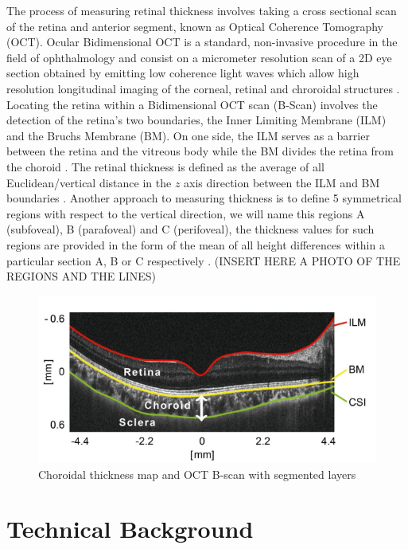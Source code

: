 \documentclass[12pt,a4paper]{scrartcl}
\begin{document}
The process of measuring retinal thickness involves taking a cross sectional scan of the retina and anterior segment, known as Optical Coherence Tomography (OCT). Ocular Bidimensional OCT is a standard, non-invasive procedure in the field of ophthalmology and consist on a micrometer resolution scan of a 2D eye section obtained by emitting low coherence light waves which allow high resolution longitudinal imaging of the corneal, retinal and chroroidal structures \cite{Ronchetti2019statistic}. Locating the retina within a Bidimensional OCT scan (B-Scan) involves the detection of the retina's two boundaries, the Inner Limiting Membrane (ILM) and the Bruchs Membrane (BM). On one side, the ILM serves as a barrier between the retina and the vitreous body \cite{MACNAIR2015343} while the BM divides the retina from the choroid \cite{BOOIJ20101}. The retinal thickness is defined as the average of all Euclidean/vertical distance in the $z$ axis direction between the ILM and BM boundaries \cite{Ronchetti2019statistic}. Another approach to measuring thickness is to define 5 symmetrical regions with respect to the vertical direction, we will name this regions A (subfoveal), B (parafoveal) and C (perifoveal), the thickness values for such regions are provided in the form of the mean of all height differences within a particular section A, B or C respectively \cite{Ronchetti2019statistic}. (INSERT  HERE A PHOTO OF THE REGIONS AND THE LINES)


\begin{figure}[H]
    \centering
    \includegraphics[width=1\textwidth]{./images/choroidalthickness}
    \caption{Choroidal thickness map and OCT B-scan with segmented layers \cite{Ronchetti2019statistic}}
    \label{fig:qc-layers}
\end{figure}

\section{Technical Background}
\end{document}
